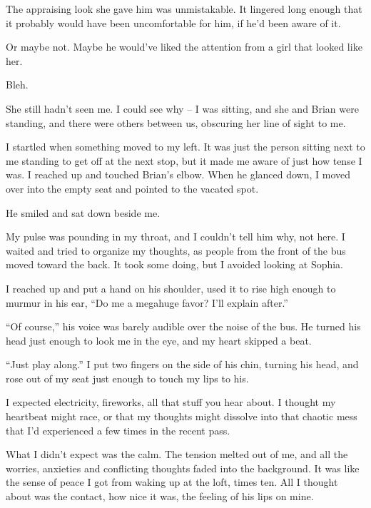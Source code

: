 The appraising look she gave him was unmistakable.  It lingered long enough that it probably would have been uncomfortable for him, if he'd been aware of it.



Or maybe not.  Maybe he would've liked the attention from a girl that looked like her.



Bleh.



She still hadn't seen me.  I could see why – I was sitting, and she and Brian were standing, and there were others between us, obscuring her line of sight to me.



I startled when something moved to my left.  It was just the person sitting next to me standing to get off at the next stop, but it made me aware of just how tense I was.  I reached up and touched Brian's elbow.  When he glanced down, I moved over into the empty seat and pointed to the vacated spot.



He smiled and sat down beside me.



My pulse was pounding in my throat, and I couldn't tell him why, not here.  I waited and tried to organize my thoughts, as people from the front of the bus moved toward the back.  It took some doing, but I avoided looking at Sophia.



I reached up and put a hand on his shoulder, used it to rise high enough to murmur in his ear, ``Do me a megahuge favor?  I'll explain after.''



``Of course,'' his voice was barely audible over the noise of the bus.  He turned his head just enough to look me in the eye, and my heart skipped a beat.



``Just play along.''  I put two fingers on the side of his chin, turning his head, and rose out of my seat just enough to touch my lips to his.



I expected electricity, fireworks, all that stuff you hear about.  I thought my heartbeat might race, or that my thoughts might dissolve into that chaotic mess that I'd experienced a few times in the recent pass.



What I didn't expect was the calm.  The tension melted out of me, and all the worries, anxieties and conflicting thoughts faded into the background.  It was like the sense of peace I got from waking up at the loft, times ten.  All I thought about was the contact, how nice it was, the feeling of his lips on mine.



